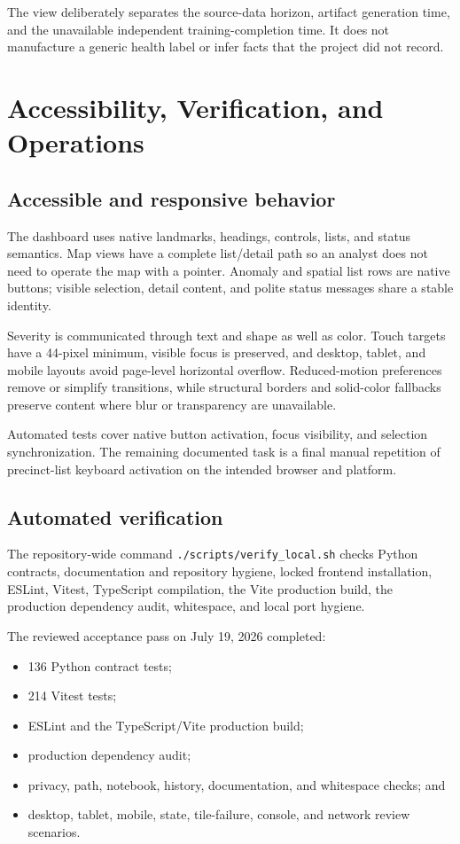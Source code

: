 \documentclass[11pt,oneside]{report}
\begin{document}
The view deliberately separates the source-data horizon, artifact generation
time, and the unavailable independent training-completion time. It does not
manufacture a generic health label or infer facts that the project did not
record.

\chapter{Accessibility, Verification, and Operations}

\section{Accessible and responsive behavior}

The dashboard uses native landmarks, headings, controls, lists, and status
semantics. Map views have a complete list/detail path so an analyst does not
need to operate the map with a pointer. Anomaly and spatial list rows are native
buttons; visible selection, detail content, and polite status messages share a
stable identity.

Severity is communicated through text and shape as well as color. Touch targets
have a 44-pixel minimum, visible focus is preserved, and desktop, tablet, and
mobile layouts avoid page-level horizontal overflow. Reduced-motion preferences
remove or simplify transitions, while structural borders and solid-color
fallbacks preserve content where blur or transparency are unavailable.

Automated tests cover native button activation, focus visibility, and selection
synchronization. The remaining documented task is a final manual repetition of
precinct-list keyboard activation on the intended browser and platform.

\section{Automated verification}

The repository-wide command \texttt{./scripts/verify\_local.sh} checks Python
contracts, documentation and repository hygiene, locked frontend installation,
ESLint, Vitest, TypeScript compilation, the Vite production build, the production
dependency audit, whitespace, and local port hygiene.

The reviewed acceptance pass on July 19, 2026 completed:

\begin{itemize}
  \item 136 Python contract tests;
  \item 214 Vitest tests;
  \item ESLint and the TypeScript/Vite production build;
  \item production dependency audit;
  \item privacy, path, notebook, history, documentation, and whitespace checks;
    and
  \item desktop, tablet, mobile, state, tile-failure, console, and network
    review scenarios.
\end{itemize}
\end{document}
